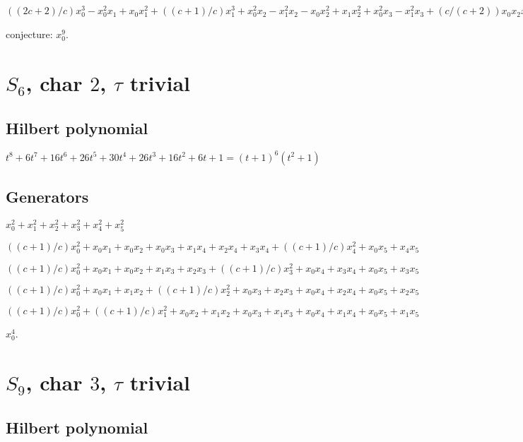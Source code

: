\documentclass{article}
\numberwithin{equation}{section}
\begin{document}
$((2c + 2)/c)x_0^3 - x_0^2x_1 + x_0x_1^2 + ((c + 1)/c)x_1^3 +
x_0^2x_2 - x_1^2x_2 - x_0x_2^2 + x_1x_2^2 + x_0^2x_3 - x_1^2x_3 +
(c/(c + 2))x_0x_2x_3 + (2c/(c + 2))x_1x_2x_3 - x_0x_3^2 +
x_1x_3^2 + x_0^2x_4 - x_1^2x_4 + (c/(c + 2))x_0x_2x_4 + (2c/(c +
2))x_1x_2x_4 + (c/(c + 2))x_0x_3x_4 + (2c/(c + 2))x_1x_3x_4 -
x_0x_4^2 + x_1x_4^2 + x_0^2x_5 - x_1^2x_5 + (c/(c + 2))x_0x_2x_5
+ (2c/(c + 2))x_1x_2x_5 + (c/(c + 2))x_0x_3x_5 + (2c/(c +
2))x_1x_3x_5 + (c/(c + 2))x_0x_4x_5 + (2c/(c + 2))x_1x_4x_5 -
x_0x_5^2 + x_1x_5^2$

conjecture: $x_0^9$.


\section{$S_6$, char $2$, $\tau$ trivial}

\subsection{Hilbert polynomial}

$t^8 + 6t^7 + 16t^6 + 26t^5 + 30t^4 + 26t^3 + 16t^2 + 6t + 1 =(t + 1)^6  (t^2 + 1)$

\subsection{Generators}

$x_0^2 + x_1^2 + x_2^2 + x_3^2 + x_4^2 + x_5^2$

$((c + 1)/c)x_0^2 + x_0x_1 + x_0x_2 + x_0x_3 + x_1x_4 + x_2x_4 +
x_3x_4 + ((c + 1)/c)x_4^2 + x_0x_5 + x_4x_5$

$((c + 1)/c)x_0^2 + x_0x_1 + x_0x_2 + x_1x_3 + x_2x_3 + ((c +
1)/c)x_3^2 + x_0x_4 + x_3x_4 + x_0x_5 + x_3x_5$

$((c + 1)/c)x_0^2 + x_0x_1 + x_1x_2 + ((c + 1)/c)x_2^2 + x_0x_3 +
x_2x_3 + x_0x_4 + x_2x_4 + x_0x_5 + x_2x_5$

$((c + 1)/c)x_0^2 + ((c + 1)/c)x_1^2 + x_0x_2 + x_1x_2 + x_0x_3 +
x_1x_3 + x_0x_4 + x_1x_4 + x_0x_5 + x_1x_5$


$x_0^4$.

\section{$S_9$, char $3$, $\tau$ trivial}

\subsection{Hilbert polynomial}
\end{document}
